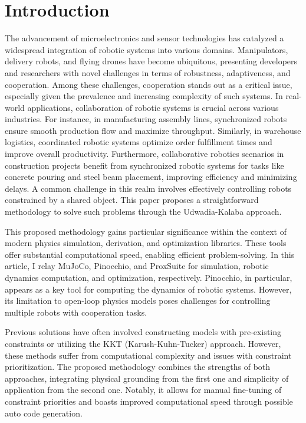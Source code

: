 \chapter{Introduction}
\label{chap:intro}

The advancement of microelectronics and sensor technologies has catalyzed a 
widespread integration of robotic systems into various domains. Manipulators, 
delivery robots, and flying drones have become ubiquitous, presenting developers 
and researchers with novel challenges in terms of robustness, adaptiveness, and 
cooperation. Among these challenges, cooperation stands out as a critical 
issue, especially given the prevalence and increasing complexity of such systems. 
In real-world applications, collaboration of robotic systems is crucial across 
various industries. For instance, in manufacturing assembly lines, synchronized 
robots ensure smooth production flow and maximize throughput. Similarly, in 
warehouse logistics, coordinated robotic systems optimize order fulfillment times 
and improve overall productivity. Furthermore, collaborative robotics scenarios in 
construction projects benefit from synchronized robotic systems for tasks like 
concrete pouring and steel beam placement, improving efficiency and minimizing 
delays. A common challenge in this realm involves effectively controlling robots 
constrained by a shared object. This paper proposes a straightforward 
methodology to solve such problems through the 
Udwadia-Kalaba\cite{UdwadiaKalabaApproach} approach.

This proposed methodology gains particular significance within the context 
of modern physics simulation, derivation, and optimization libraries. These 
tools offer substantial computational speed, enabling efficient 
problem-solving. In this article, I relay MuJoCo\cite{MuJoCo}, 
Pinocchio\cite{Pinocchio}, and ProxSuite\cite{ProxQP} 
for simulation, robotic dynamics computation, and optimization, respectively. 
Pinocchio, in particular, appears as a key tool for computing the dynamics of 
robotic systems. However, its limitation to open-loop physics models poses 
challenges for controlling multiple robots with cooperation tasks.

Previous solutions have often involved constructing models with pre-existing 
constraints or utilizing the KKT (Karush-Kuhn-Tucker) approach. 
However, these methods suffer from computational complexity and issues with 
constraint prioritization. The proposed methodology combines the strengths 
of both approaches, integrating physical grounding from the first one and 
simplicity of application from the second one. Notably, it allows for 
manual fine-tuning of constraint priorities and boasts improved 
computational speed through possible auto code generation. 

